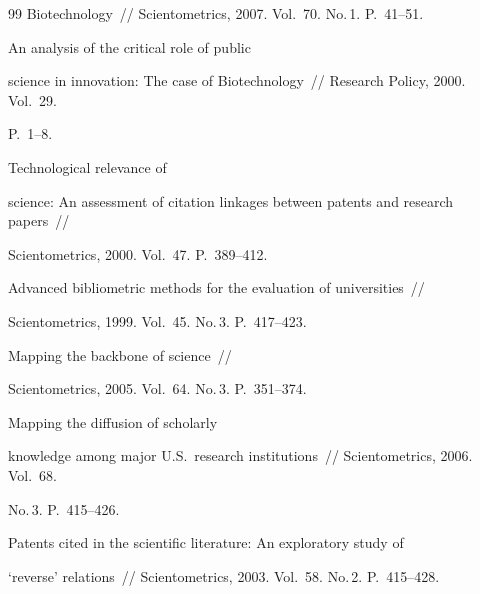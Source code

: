 {{\begin{thebibliography}{99}
Biotechnology~/\!\!/ Scientometrics, 2007. Vol.~70. No.\,1. P.~41--51. 




 An analysis of the critical role of public 


science in innovation: The case of Biotechnology~/\!\!/ Research Policy, 2000. Vol.~29. 


P.~1--8.




 Technological relevance of 


science: An assessment of citation linkages between patents and research papers~/\!\!/ 


Scientometrics, 2000. Vol.~47. P.~389--412.


 




 Advanced bibliometric methods for the evaluation of universities~/\!\!/ 


Scientometrics, 1999. Vol.~45. No.\,3. P.~417--423.







 Mapping the backbone of science~/\!\!/ 


Scientometrics, 2005. Vol.~64. No.\,3. P.~351--374.







 Mapping the diffusion of scholarly 


knowledge among major U.S.\ research institutions~/\!\!/ Scientometrics, 2006. Vol.~68. 


No.\,3. P.~415--426.





    \label{end\stat}


    




 Patents cited in the scientific literature: An exploratory study of 


`reverse' relations~/\!\!/ Scientometrics, 2003. Vol.~58. No.\,2. P.~415--428.


    


 \end{thebibliography}


}


}


